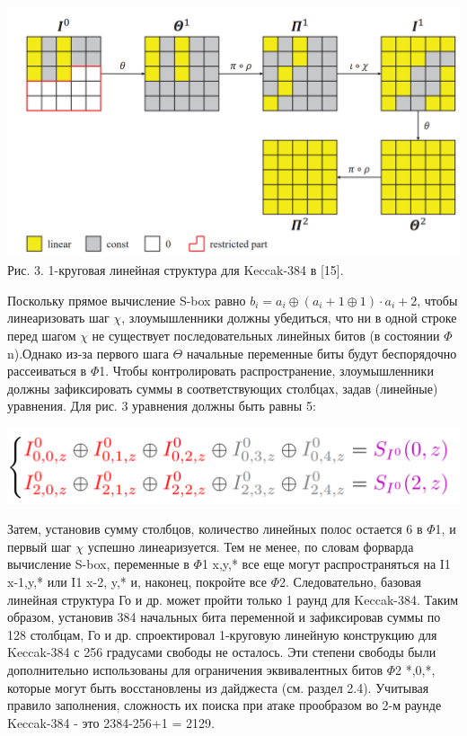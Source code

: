 \documentclass[utf8,14pt,a4paper,oneside,russian]{book}
\begin{document}
\begin{center}
    \includegraphics*[scale=0.45]{9}\\
    Рис. 3. 1-круговая линейная структура для Keccak-384 в [15].
\end{center}

Поскольку прямое вычисление S-box равно $b_i = a_i \oplus (a_i + 1 \oplus 1) \cdot a_i+2$, чтобы линеаризовать
шаг $\chi$, злоумышленники должны убедиться, что ни в одной строке перед шагом $\chi$ не существует последовательных линейных битов
(в состоянии $\Phi$n).Однако из-за первого шага $\Theta$ начальные переменные биты будут
беспорядочно рассеиваться в $\Phi$1. Чтобы контролировать распространение, злоумышленники должны зафиксировать
суммы в соответствующих столбцах, задав (линейные) уравнения. Для рис. 3 уравнения должны быть равны 5:

\begin{center}
    \includegraphics*[scale=0.3]{10}
\end{center}

Затем, установив сумму столбцов, количество линейных полос остается 6 в $\Phi$1, и первый шаг $\chi$ успешно линеаризуется.
Тем не менее, по словам форварда вычисление S-box, переменные в $\Phi$1 x,y,* все еще могут распространяться на I1 x-1,y,* или I1
x-2, y,* и, наконец, покройте все $\Phi$2. Следовательно, базовая линейная структура Го и др. может
пройти только 1 раунд для Keccak-384. Таким образом, установив 384 начальных бита переменной и зафиксировав суммы по 128 столбцам,
Го и др. спроектировал 1-круговую линейную конструкцию для Keccak-384 с 256 градусами свободы не осталось.
Эти степени свободы были дополнительно использованы для ограничения эквивалентных битов $\Phi$2 *,0,*, которые могут быть восстановлены
из дайджеста (см. раздел 2.4). Учитывая правило заполнения, сложность их поиска при атаке прообразом во 2-м раунде
Keccak-384 - это 2384-256+1 = 2129.
\end{document}
